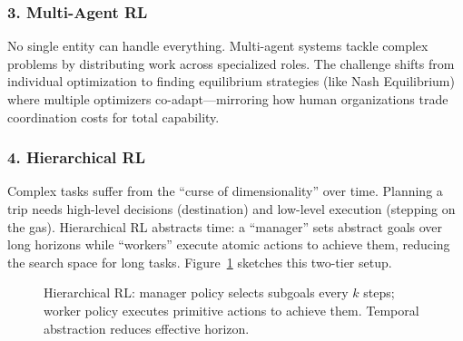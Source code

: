 \documentclass[12pt,a4paper]{report}
\theoremstyle{definition}
\begin{document}
\subsubsection*{3. Multi-Agent RL}
No single entity can handle everything. Multi-agent systems tackle complex problems by distributing work across specialized roles. The challenge shifts from individual optimization to finding equilibrium strategies (like Nash Equilibrium) where multiple optimizers co-adapt---mirroring how human organizations trade coordination costs for total capability.

\subsubsection*{4. Hierarchical RL}
Complex tasks suffer from the ``curse of dimensionality'' over time. Planning a trip needs high-level decisions (destination) and low-level execution (stepping on the gas). Hierarchical RL abstracts time: a ``manager'' sets abstract goals over long horizons while ``workers'' execute atomic actions to achieve them, reducing the search space for long tasks. Figure~\ref{fig:hierarchical} sketches this two-tier setup.

\begin{figure}[htbp]
\centering
{}
\caption{Hierarchical RL: manager policy selects subgoals every $k$ steps; worker policy executes primitive actions to achieve them. Temporal abstraction reduces effective horizon.}
\label{fig:hierarchical}
\end{figure}
\end{document}
